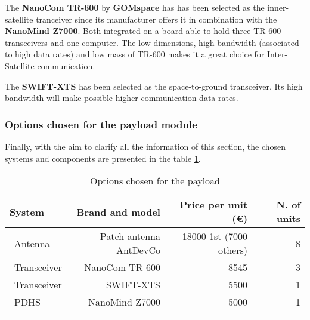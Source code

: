 The \textbf{NanoCom TR-600} by \textbf{GOMspace} has has been selected as the inner-satellite tranceiver since its manufacturer offers it in combination with the \textbf{NanoMind Z7000}. Both integrated on a board able to hold three TR-600 transceivers and one computer. The low dimensions, high bandwidth (associated to high data rates) and low mass of TR-600 makes it a great choice for Inter-Satellite communication.

The \textbf{SWIFT-XTS} has been selected as the space-to-ground transceiver. Its high bandwidth will make possible higher communication data rates.

\subsubsection{Options chosen for the payload module}

Finally, with the aim to clarify all the information of this section, the chosen systems and components are presented in the table \ref{payloadchosen}.

\begin{longtable}{| l | r | r | r |}
	\hline
	\rowcolor[gray]{0.80}	\textbf{System} &  \textbf{Brand and model}     & \textbf{Price per unit (\euro)} & \textbf{N. of units}  \\
	\hline
	\endfirsthead
	
	~Antenna & Patch antenna AntDevCo & 18000 1st (7000 others) & 8 \\
	~Transceiver & NanoCom TR-600 & 8545 & 3 \\
	~Transceiver & SWIFT-XTS & 5500 &1\\
	~PDHS & NanoMind Z7000 & 5000 & 1 \\
	\hline
	
\caption{Options chosen for the payload}
\label{payloadchosen}
\end{longtable}